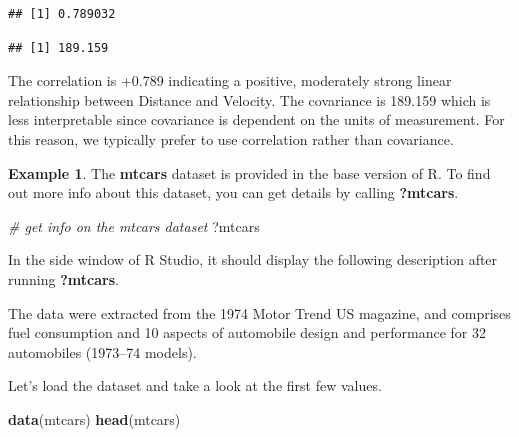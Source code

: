\documentclass[
  11pt,
  oneside]{book}
\newenvironment{Shaded}{\begin{snugshade}}{\end{snugshade}}
\newcommand{\CommentTok}[1]{\textcolor[rgb]{0.56,0.35,0.01}{\textit{#1}}}
\newcommand{\FunctionTok}[1]{\textcolor[rgb]{0.13,0.29,0.53}{\textbf{#1}}}
\newcommand{\NormalTok}[1]{#1}
\newcommand{\SpecialCharTok}[1]{\textcolor[rgb]{0.81,0.36,0.00}{\textbf{#1}}}
\theoremstyle{definition}
\theoremstyle{definition}
\newtheorem{example}{Example}[chapter]
\theoremstyle{definition}
\theoremstyle{definition}
\theoremstyle{remark}
\begin{document}
\begin{verbatim}
## [1] 0.789032
\end{verbatim}

\begin{Shaded}
\end{Shaded}

\begin{verbatim}
## [1] 189.159
\end{verbatim}

The correlation is +0.789 indicating a positive, moderately strong linear relationship between Distance and Velocity. The covariance is 189.159 which is less interpretable since covariance is dependent on the units of measurement. For this reason, we typically prefer to use correlation rather than covariance.

\newpage

\begin{example}
The \textbf{mtcars} dataset is provided in the base version of R. To find out more info about this dataset, you can get details by calling \textbf{?mtcars}.
\end{example}

\begin{Shaded}
\begin{Highlighting}[]
\CommentTok{\# get info on the mtcars dataset}
\NormalTok{?mtcars}
\end{Highlighting}
\end{Shaded}

In the side window of R Studio, it should display the following description after running \textbf{?mtcars}.

The data were extracted from the 1974 Motor Trend US magazine, and comprises fuel consumption and 10 aspects of automobile design and performance for 32 automobiles (1973--74 models).

Let's load the dataset and take a look at the first few values.

\begin{Shaded}
\begin{Highlighting}[]
\FunctionTok{data}\NormalTok{(mtcars)}
\FunctionTok{head}\NormalTok{(mtcars)}
\end{Highlighting}
\end{Shaded}
\end{document}
